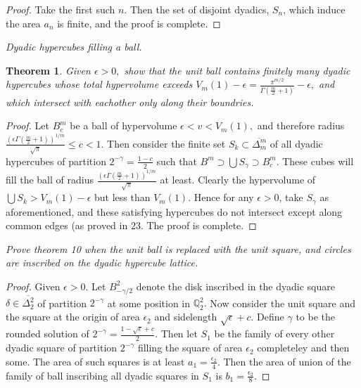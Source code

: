 \documentclass[letter]{article}
\newtheorem{theorem}{Theorem}
\newenvironment{menumerate}{%
  \edef\backupindent{\the\parindent}%
  \enumerate%
  \setlength{\parindent}{\backupindent}%
}{\endenumerate}
\begin{document}
\begin{menumerate}
\begin{menumerate}
\begin{proof}
				 	Take the first such $n.$ Then the set of disjoint dyadics, $S_n$, which induce the area $a_n$ is finite, and the proof is complete.
				\end{proof}

				\item \textit{Dyadic hypercubes filling a ball.}
				\begin{theorem}
				Given $\epsilon > 0,$ show that the unit ball contains finitely many dyadic hypercubes whose total hypervolume exceeds $V_m(1) -\epsilon = \frac{\pi^{m/2}}{\Gamma(\frac{m}{2}+1)} - \epsilon,$ and which intersect with eachother only along their boundries.
				\end{theorem}

				\begin{proof}
				     Let $B_c^m$ be a ball of hypervolume $\epsilon < v < V_m(1),$ and therefore radius $\frac{\left(\epsilon\Gamma(\frac{m}{2} + 1)\right)^{1/m}}{\sqrt{\pi}} \leq c < 1$. Then consider the finite set $S_k \subset \overline{\Delta_m^m}$ of all dyadic hypercubes of partition $2^{-\gamma} = \frac{1 - c}{2}$ such that $B^m \supset \bigcup S_\gamma \supset B_c^m$. These cubes will fill the ball of radius $\frac{\left(\epsilon\Gamma(\frac{m}{2} + 1)\right)^{1/m}}{\sqrt{\pi}}$ at least. Clearly the hypervolume of $\bigcup S_k > V_m(1) - \epsilon$ but less than $V_m(1).$ Hence for any $\epsilon > 0$, take $S_\gamma$ as aforementioned, and these satisfying hypercubes do not intersect except along common edges (as proved in $23$. The proof is complete.
				\end{proof}


				\item \textit{Prove theorem 10 when the unit ball is replaced with the unit square, and circles are inscribed on the dyadic hypercube lattice.}
				\begin{proof}
					Given $\epsilon > 0.$ Let $B^2_{-\gamma/2}$ denote the disk inscribed in the dyadic square $\delta \in \overline{\Delta_2^2}$ of partition $2^{-\gamma}$ at some position in $\mathbb{Q}_2^2.$ Now consider the unit square and the square at the origin of area $\epsilon_2$ and sidelength $\sqrt{\epsilon}+c.$ Define $\gamma$ to be the rounded solution of $2^{-\gamma} = \frac{1- \sqrt{\epsilon}+c}{2}.$ Then let $S_1$ be the family of every other dyadic square of partition $2^{-\gamma}$ filling the square of area $\epsilon_2$ completeley and then some. The area of such squares is at least $a_1 = \frac{\epsilon_2}{4}. $ Then the area of union of the family of ball inscribing all dyadic squares in $S_1$ is $b_1 = \frac{\epsilon_2}{8}.$ 


\end{proof}
\end{menumerate}
\end{menumerate}
\end{document}
